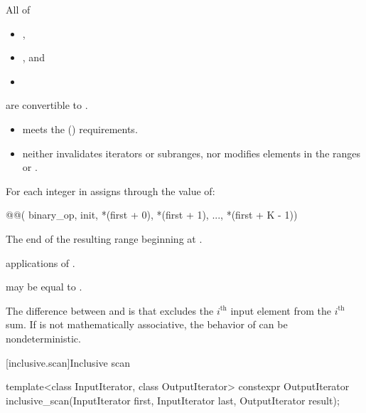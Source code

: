\begin{itemdescr}
\pnum
\mandates
  All of
  \begin{itemize}
  \item {},
  \item {}, and
  \item {}
  \end{itemize}
  are convertible to .


\pnum
\expects
\begin{itemize}
\item
   meets the  () requirements.
\item
   neither invalidates iterators or subranges,
  nor modifies elements in
  the ranges  or .
\end{itemize}

\pnum
\effects
For each integer  in 
assigns through  the value of:
\begin{codeblock}
@@(
    binary_op, init, *(first + 0), *(first + 1), ..., *(first + K - 1))
\end{codeblock}

\pnum
\returns
The end of the resulting range beginning at .

\pnum
\complexity
{} applications of .

\pnum
\remarks
{} may be equal to .

\pnum
\begin{note}
The difference between  and  is
that  excludes the $i^\text{th}$ input element
from the $i^\text{th}$ sum.
If  is not mathematically associative,
the behavior of  can be nondeterministic.
\end{note}
\end{itemdescr}

[inclusive.scan]{Inclusive scan}

%
\begin{itemdecl}
template<class InputIterator, class OutputIterator>
  constexpr OutputIterator
    inclusive_scan(InputIterator first, InputIterator last,
                   OutputIterator result);
\end{itemdecl}

